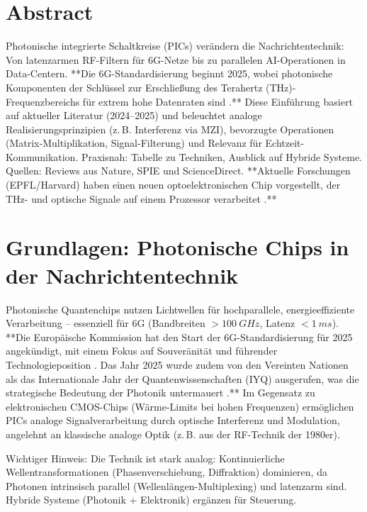 
	\section*{Abstract}
	Photonische integrierte Schaltkreise (PICs) verändern die Nachrichtentechnik: Von latenzarmen RF-Filtern für 6G-Netze bis zu parallelen AI-Operationen in Data-Centern. **Die 6G-Standardisierung beginnt 2025, wobei photonische Komponenten der Schlüssel zur Erschließung des Terahertz (THz)-Frequenzbereichs für extrem hohe Datenraten sind \cite{6g_roadmap}.** Diese Einführung basiert auf aktueller Literatur (2024–2025) und beleuchtet analoge Realisierungsprinzipien (z.\,B. Interferenz via MZI), bevorzugte Operationen (Matrix-Multiplikation, Signal-Filterung) und Relevanz für Echtzeit-Kommunikation. Praxisnah: Tabelle zu Techniken, Ausblick auf Hybride Systeme. Quellen: Reviews aus Nature, SPIE und ScienceDirect. **Aktuelle Forschungen (EPFL/Harvard) haben einen neuen optoelektronischen Chip vorgestellt, der THz- und optische Signale auf einem Prozessor verarbeitet \cite{thz_epfl}.**
	
	\section{Grundlagen: Photonische Chips in der Nachrichtentechnik}
	
	Photonische Quantenchips nutzen Lichtwellen für hochparallele, energieeffiziente Verarbeitung – essenziell für 6G (Bandbreiten $>\SI{100}{GHz}$, Latenz $<\SI{1}{ms}$). **Die Europäische Kommission hat den Start der 6G-Standardisierung für 2025 angekündigt, mit einem Fokus auf Souveränität und führender Technologieposition \cite{6g_roadmap}. Das Jahr 2025 wurde zudem von den Vereinten Nationen als das Internationale Jahr der Quantenwissenschaften (IYQ) ausgerufen, was die strategische Bedeutung der Photonik untermauert \cite{quantenjahr25}.** Im Gegensatz zu elektronischen CMOS-Chips (Wärme-Limits bei hohen Frequenzen) ermöglichen PICs analoge Signalverarbeitung durch optische Interferenz und Modulation, angelehnt an klassische analoge Optik (z.\,B. aus der RF-Technik der 1980er).
	\begin{important}
		Wichtiger Hinweis: Die Technik ist stark analog: Kontinuierliche Wellentransformationen (Phasenverschiebung, Diffraktion) dominieren, da Photonen intrinsisch parallel (Wellenlängen-Multiplexing) und latenzarm sind. Hybride Systeme (Photonik + Elektronik) ergänzen für Steuerung.
	\end{important}
	
